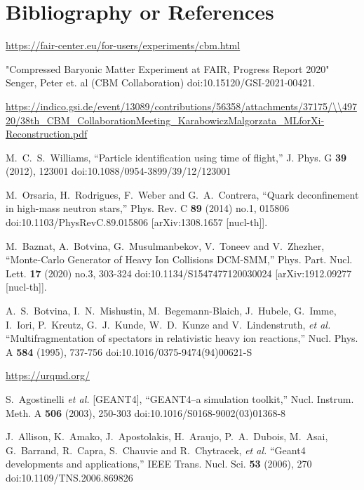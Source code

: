 \documentclass[12pt,a4paper]{report}
\begin{document}
\chapter{Bibliography or References}
\begin{thebibliography}{9}

\url{https://fair-center.eu/for-users/experiments/cbm.html}

"Compressed Baryonic Matter Experiment at FAIR, Progress Report 2020" Senger, Peter et. al (CBM Collaboration) doi:10.15120/GSI-2021-00421. 

\url{https://indico.gsi.de/event/13089/contributions/56358/attachments/37175/\\49720/38th\_CBM\_CollaborationMeeting\_KarabowiczMalgorzata\_MLforXi-Reconstruction.pdf}

M.~C.~S.~Williams,
``Particle identification using time of flight,''
J. Phys. G \textbf{39} (2012), 123001
doi:10.1088/0954-3899/39/12/123001

M.~Orsaria, H.~Rodrigues, F.~Weber and G.~A.~Contrera,
``Quark deconfinement in high-mass neutron stars,''
Phys. Rev. C \textbf{89} (2014) no.1, 015806
doi:10.1103/PhysRevC.89.015806
[arXiv:1308.1657 [nucl-th]].

M.~Baznat, A.~Botvina, G.~Musulmanbekov, V.~Toneev and V.~Zhezher,
``Monte-Carlo Generator of Heavy Ion Collisions DCM-SMM,''
Phys. Part. Nucl. Lett. \textbf{17} (2020) no.3, 303-324
doi:10.1134/S1547477120030024
[arXiv:1912.09277 [nucl-th]].

A.~S.~Botvina, I.~N.~Mishustin, M.~Begemann-Blaich, J.~Hubele, G.~Imme, I.~Iori, P.~Kreutz, G.~J.~Kunde, W.~D.~Kunze and V.~Lindenstruth, \textit{et al.}
``Multifragmentation of spectators in relativistic heavy ion reactions,''
Nucl. Phys. A \textbf{584} (1995), 737-756
doi:10.1016/0375-9474(94)00621-S

\url{https://urqmd.org/}

S.~Agostinelli \textit{et al.} [GEANT4],
``GEANT4--a simulation toolkit,''
Nucl. Instrum. Meth. A \textbf{506} (2003), 250-303
doi:10.1016/S0168-9002(03)01368-8

J.~Allison, K.~Amako, J.~Apostolakis, H.~Araujo, P.~A.~Dubois, M.~Asai, G.~Barrand, R.~Capra, S.~Chauvie and R.~Chytracek, \textit{et al.}
``Geant4 developments and applications,''
IEEE Trans. Nucl. Sci. \textbf{53} (2006), 270
doi:10.1109/TNS.2006.869826


\end{thebibliography}
\end{document}
